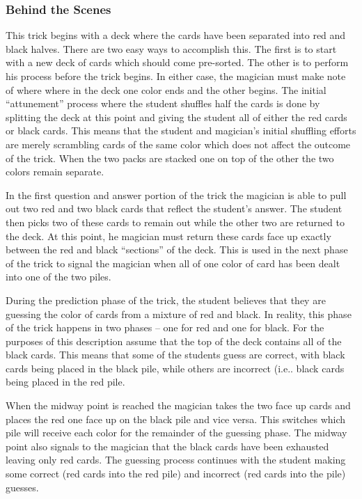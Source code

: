 \subsubsection{Behind the Scenes}

This trick begins with a deck where the cards have
been separated into red and black halves.  There are two easy ways to accomplish
this.  The first is to start with a new deck of cards which should come
pre-sorted.  The other is to perform his process before the trick begins.  In
either case, the magician must make note of where where in the deck
one color ends and the other begins.  The initial ``attunement'' process where
the student shuffles half the cards is done by splitting the deck at this point
and giving the student all of either the red cards or black cards.  This means
that the student and magician's initial shuffling efforts are merely scrambling
cards of the same color which does not affect the outcome of the trick.  When
the two packs are stacked one on top of the other the two colors remain
separate.

In the first question and answer portion of the trick the magician is able to
pull out two red and two black cards that reflect the student's answer.  The
student then picks two of these cards to remain out while the other two are
returned to the deck.  At this point, he magician must return these cards face
up exactly between the red and black ``sections'' of the deck.  This is used in
the next phase of the trick to signal the magician when all of one color of card
has been dealt into one of the two piles.

During the prediction phase of the trick, the student believes that they are
guessing the color of cards from a mixture of red and black.  In reality, this
phase of the trick happens in two phases -- one for red and one
for black.  For the purposes of this description assume that the top of the deck
contains all of the black cards.  This means that some of the students
guess are correct, with black cards being placed in the black pile, while
others are incorrect (i.e.. black cards being placed in the red pile.

When the midway point is reached the magician takes the two face up cards and places the
red one face up on the black pile and vice versa.  This switches which pile will
receive each color for the remainder of the guessing phase.  The midway point
also signals to the magician that the black cards have been
exhausted leaving only red cards.  The guessing process continues with the
student making some correct (red cards into the red pile) and incorrect (red
cards into the pile) guesses.

